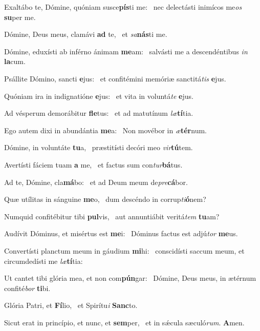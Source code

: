 \item Exaltábo te, Dómine, quóniam susce\textbf{pís}ti me:~\psstar{} nec delectásti inimícos me\textit{os} \textbf{su}per me.
\item Dómine, Deus meus, clamávi \textbf{ad} te,~\psstar{} et \textit{sa}\textbf{nás}ti me.
\item Dómine, eduxísti ab inférno ánimam \textbf{me}am:~\psstar{} salvásti me a descendéntibus \textit{in} \textbf{la}cum.
\item Psállite Dómino, sancti \textbf{e}jus:~\psstar{} et confitémini memóriæ sanctitá\textit{tis} \textbf{e}jus.
\item Quóniam ira in indignatióne \textbf{e}jus:~\psstar{} et vita in voluntá\textit{te} \textbf{e}jus.
\item Ad vésperum demorábitur \textbf{fle}tus:~\psstar{} et ad matutínum \textit{læ}\textbf{tí}tia.
\item Ego autem dixi in abundántia \textbf{me}a:~\psstar{} Non movébor in \textit{æ}\textbf{tér}num.
\item Dómine, in voluntáte \textbf{tu}a,~\psstar{} præstitísti decóri meo \textit{vir}\textbf{tú}tem.
\item Avertísti fáciem tuam \textbf{a} me,~\psstar{} et factus sum con\textit{tur}\textbf{bá}tus.
\item Ad te, Dómine, cla\textbf{má}bo:~\psstar{} et ad Deum meum de\textit{pre}\textbf{cá}bor.
\item Quæ utílitas in sánguine \textbf{me}o,~\psstar{} dum descéndo in corrup\textit{ti}\textbf{ó}nem?
\item Numquid confitébitur tibi \textbf{pul}vis,~\psstar{} aut annuntiábit veritá\textit{tem} \textbf{tu}am?
\item Audívit Dóminus, et misértus est \textbf{me}i:~\psstar{} Dóminus factus est adjú\textit{tor} \textbf{me}us.
\item Convertísti planctum meum in gáudium \textbf{mi}hi:~\psstar{} conscidísti saccum meum, et circumdedísti me \textit{læ}\textbf{tí}tia:
\item Ut cantet tibi glória mea, et non com\textbf{pún}gar:~\psstar{} Dómine, Deus meus, in ætérnum confité\textit{bor} \textbf{ti}bi.
\item Glória Patri, et \textbf{Fí}lio,~\psstar{} et Spirítu\textit{i} \textbf{Sanc}to.
\item Sicut erat in princípio, et nunc, et \textbf{sem}per,~\psstar{} et in sǽcula sæculó\textit{rum}. \textbf{A}men.

